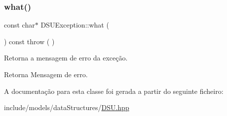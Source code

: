 \subsubsection{\texorpdfstring{what()}{what()}}
{\footnotesize\ttfamily const char$\ast$ D\+S\+U\+Exception\+::what (\begin{DoxyParamCaption}{ }\end{DoxyParamCaption}) const throw ( ) \hspace{0.3cm}{\ttfamily [inline]}}

Retorna a mensagem de erro da exceção. \begin{DoxyReturn}{Retorna}
Mensagem de erro. 
\end{DoxyReturn}


A documentação para esta classe foi gerada a partir do seguinte ficheiro\+:\begin{DoxyCompactItemize}
\item 
include/models/data\+Structures/\mbox{\hyperlink{DSU_8hpp}{D\+S\+U.\+hpp}}\end{DoxyCompactItemize}
